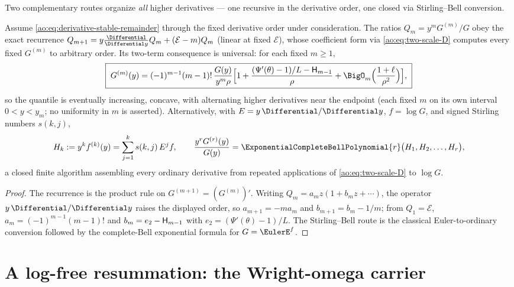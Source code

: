 Two complementary routes organize \emph{all} higher derivatives ---
one recursive in the derivative order, one closed via Stirling--Bell
conversion.

\begin{theorem}
\label{ao:thm:derivative-hierarchy}
Assume \eqref{ao:eq:derivative-stable-remainder} through the fixed derivative
order under consideration.
The ratios $Q_m=y^{m}G^{(m)}/G$ obey the exact recurrence
$Q_{m+1}=y\tfrac{\Differential}{\Differential y}Q_m+(\mathcal E-m)Q_m$ (linear at fixed
$\mathcal E$), whose coefficient form via
\eqref{ao:eq:two-scale-D} computes every fixed $G^{(m)}$ to arbitrary
order.  Its two-term consequence is universal: for each fixed
$m\ge1$,
\begin{equation}
 \boxed{\;
 G^{(m)}(y)=(-1)^{m-1}(m-1)!\,
 \frac{G(y)}{y^{m}\rho}
 \Bigl[1+\frac{(\Psi'(\theta)-1)/L-\Hnum_{m-1}}{\rho}
 +\BigO_m\Bigl(\frac{1+\ell}{\rho^{2}}\Bigr)\Bigr],
 \;}
 \label{ao:eq:two-term-derivative}
\end{equation}
so the quantile is eventually increasing, concave, with alternating
higher derivatives near the endpoint (each fixed $m$ on its own
interval $0<y<y_m$; no uniformity in $m$ is asserted).
Alternatively, with $E=y\,\Differential/\Differential y$, $f=\log G$, and signed
Stirling numbers $s(k,j)$,
\begin{equation}
 H_k:=y^{k}f^{(k)}(y)=\sum_{j=1}^{k}s(k,j)\,E^{j}f,
 \qquad
 \frac{y^{r}G^{(r)}(y)}{G(y)}
 =\ExponentialCompleteBellPolynomial{r}\bigl(H_1,H_2,\dots,H_r\bigr),
 \label{ao:eq:stirling-bell}
\end{equation}
a closed finite algorithm assembling every ordinary derivative from
repeated applications of \eqref{ao:eq:two-scale-D} to $\log G$.
\end{theorem}

\begin{proof}
The recurrence is the product rule on
$G^{(m+1)}=(G^{(m)})'$.  Writing
$Q_m=a_mz(1+b_mz+\cdots)$, the operator $y\,\Differential/\Differential y$ raises the
displayed order, so $a_{m+1}=-ma_m$ and $b_{m+1}=b_m-1/m$; from
$Q_1=\mathcal E$, $a_m=(-1)^{m-1}(m-1)!$ and
$b_m=e_2-\mathsf H_{m-1}$ with $e_2=(\Psi'(\theta)-1)/L$.  The
Stirling--Bell route is the classical Euler-to-ordinary conversion
followed by the complete-Bell exponential formula for
$G=\EulerE^{f}$.
\end{proof}


\section{A log-free resummation: the Wright-omega carrier}
\label{ao:sec:wcarrier}


